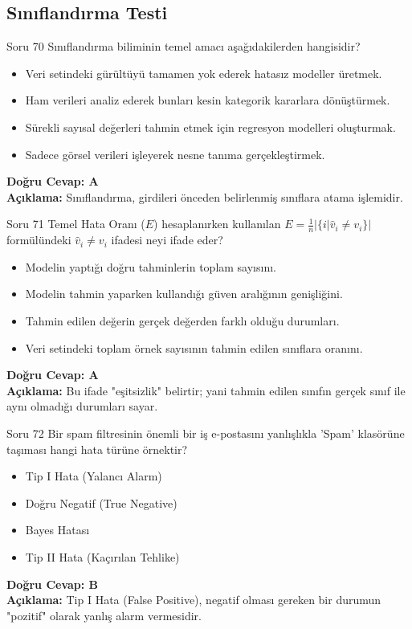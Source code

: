 \documentclass[12pt,a4paper]{article}
\begin{document}
\newpage
\subsection{Sınıflandırma Testi}

\begin{testcard}{Soru 70}
    Sınıflandırma biliminin temel amacı aşağıdakilerden hangisidir?
    \begin{itemize}
        \item[A)] Veri setindeki gürültüyü tamamen yok ederek hatasız modeller üretmek.
        \item[B)] Ham verileri analiz ederek bunları kesin kategorik kararlara dönüştürmek.
        \item[C)] Sürekli sayısal değerleri tahmin etmek için regresyon modelleri oluşturmak.
        \item[D)] Sadece görsel verileri işleyerek nesne tanıma gerçekleştirmek.
    \end{itemize}
    \tcblower
    \textbf{Doğru Cevap: A} \\
    \textbf{Açıklama:} Sınıflandırma, girdileri önceden belirlenmiş sınıflara atama işlemidir.
\end{testcard}

\begin{testcard}{Soru 71}
    Temel Hata Oranı ($E$) hesaplanırken kullanılan $E = \frac{1}{n} |\{i | \hat{v}_i \neq v_i\}|$ formülündeki $\hat{v}_i \neq v_i$ ifadesi neyi ifade eder?
    \begin{itemize}
        \item[A)] Modelin yaptığı doğru tahminlerin toplam sayısını.
        \item[B)] Modelin tahmin yaparken kullandığı güven aralığının genişliğini.
        \item[C)] Tahmin edilen değerin gerçek değerden farklı olduğu durumları.
        \item[D)] Veri setindeki toplam örnek sayısının tahmin edilen sınıflara oranını.
    \end{itemize}
    \tcblower
    \textbf{Doğru Cevap: A} \\
    \textbf{Açıklama:} Bu ifade "eşitsizlik" belirtir; yani tahmin edilen sınıfın gerçek sınıf ile aynı olmadığı durumları sayar.
\end{testcard}

\begin{testcard}{Soru 72}
    Bir spam filtresinin önemli bir iş e-postasını yanlışlıkla 'Spam' klasörüne taşıması hangi hata türüne örnektir?
    \begin{itemize}
        \item[A)] Tip I Hata (Yalancı Alarm)
        \item[B)] Doğru Negatif (True Negative)
        \item[C)] Bayes Hatası
        \item[D)] Tip II Hata (Kaçırılan Tehlike)
    \end{itemize}
    \tcblower
    \textbf{Doğru Cevap: B} \\
    \textbf{Açıklama:} Tip I Hata (False Positive), negatif olması gereken bir durumun "pozitif" olarak yanlış alarm vermesidir.
\end{testcard}
\end{document}
